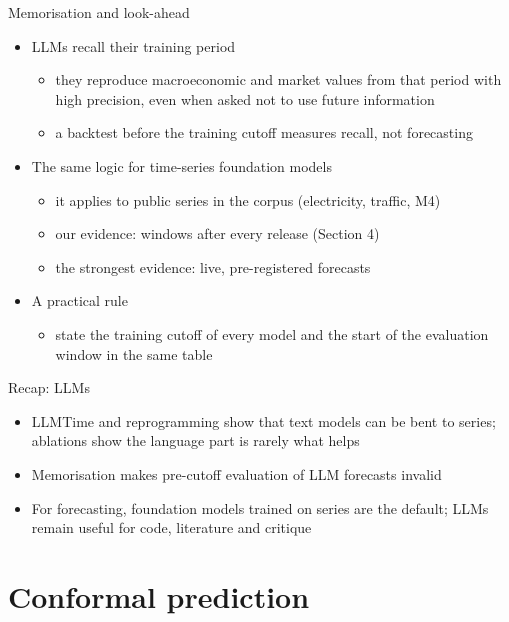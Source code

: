 \begin{frame}{Memorisation and look-ahead}
\itemsize{\small}
\begin{itemize}
    \item LLMs recall their training period 
    \begin{itemize}
        \item they reproduce macroeconomic and market values from that period with high precision, even when asked not to use future information
        \item a backtest before the training cutoff measures recall, not forecasting
    \end{itemize}
    \item The same logic for time-series foundation models
    \begin{itemize}
        \item it applies to public series in the corpus (electricity, traffic, M4)
        \item our evidence: windows after every release (Section 4)
        \item the strongest evidence: live, pre-registered forecasts
    \end{itemize}
    \item A practical rule
    \begin{itemize}
        \item state the training cutoff of every model and the start of the evaluation window in the same table
    \end{itemize}
\end{itemize}
\end{frame}

\begin{frame}{Recap: LLMs}
\itemsize{\small}
\begin{itemize}
    \item LLMTime and reprogramming show that text models can be bent to series; ablations show the language part is rarely what helps
    \item Memorisation makes pre-cutoff evaluation of LLM forecasts invalid
    \item For forecasting, foundation models trained on series are the default; LLMs remain useful for code, literature and critique
\end{itemize}
\end{frame}


\section{Conformal prediction}

